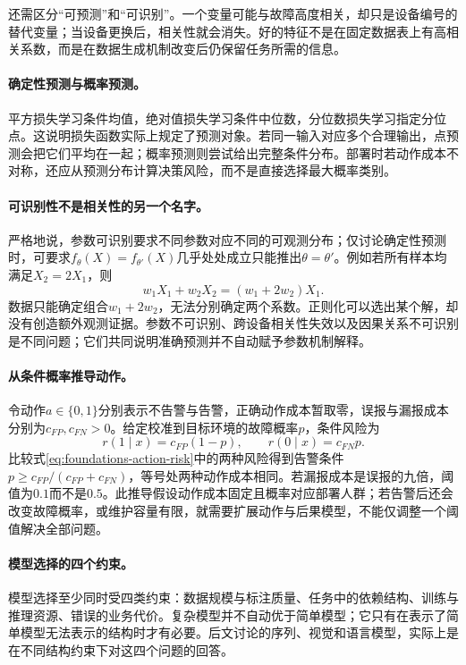 还需区分“可预测”和“可识别”。一个变量可能与故障高度相关，却只是设备编号的替代变量；当设备更换后，相关性就会消失。好的特征不是在固定数据表上有高相关系数，而是在数据生成机制改变后仍保留任务所需的信息。

\paragraph{确定性预测与概率预测。}
平方损失学习条件均值，绝对值损失学习条件中位数，分位数损失学习指定分位点。这说明损失函数实际上规定了预测对象。若同一输入对应多个合理输出，点预测会把它们平均在一起；概率预测则尝试给出完整条件分布。部署时若动作成本不对称，还应从预测分布计算决策风险，而不是直接选择最大概率类别。

\paragraph{可识别性不是相关性的另一个名字。}
严格地说，参数可识别要求不同参数对应不同的可观测分布；仅讨论确定性预测时，可要求$f_\theta(X)=f_{\theta'}(X)$几乎处处成立只能推出$\theta=\theta'$。例如若所有样本均满足$X_2=2X_1$，则
\begin{equation}
 w_1X_1+w_2X_2=(w_1+2w_2)X_1.
\end{equation}
数据只能确定组合$w_1+2w_2$，无法分别确定两个系数。正则化可以选出某个解，却没有创造额外观测证据。参数不可识别、跨设备相关性失效以及因果关系不可识别是不同问题；它们共同说明准确预测并不自动赋予参数机制解释。

\paragraph{从条件概率推导动作。}
令动作$a\in\{0,1\}$分别表示不告警与告警，正确动作成本暂取零，误报与漏报成本分别为$c_{FP},c_{FN}>0$。给定校准到目标环境的故障概率$p$，条件风险为
\begin{equation}
 r(1\mid x)=c_{FP}(1-p),\qquad r(0\mid x)=c_{FN}p.\label{eq:foundations-action-risk}
\end{equation}
比较式\eqref{eq:foundations-action-risk}中的两种风险得到告警条件$p\geq c_{FP}/(c_{FP}+c_{FN})$，等号处两种动作成本相同。若漏报成本是误报的九倍，阈值为$0.1$而不是$0.5$。此推导假设动作成本固定且概率对应部署人群；若告警后还会改变故障概率，或维护容量有限，就需要扩展动作与后果模型，不能仅调整一个阈值解决全部问题。

\paragraph{模型选择的四个约束。}
模型选择至少同时受四类约束：数据规模与标注质量、任务中的依赖结构、训练与推理资源、错误的业务代价。复杂模型并不自动优于简单模型；它只有在表示了简单模型无法表示的结构时才有必要。后文讨论的序列、视觉和语言模型，实际上是在不同结构约束下对这四个问题的回答。

